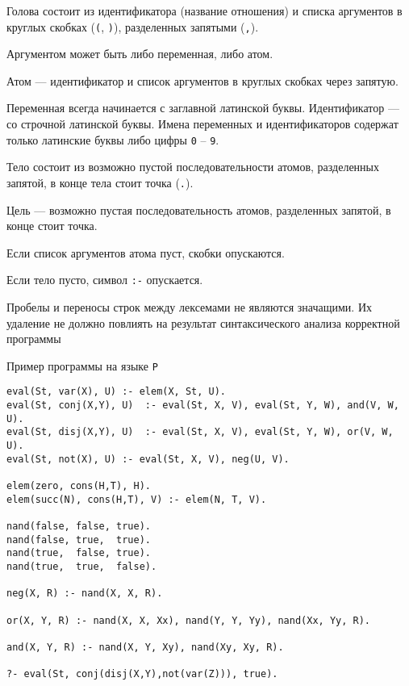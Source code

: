 \documentclass[12pt]{article}
\begin{document}
Голова состоит из идентификатора (название отношения) и списка аргументов в круглых скобках (\verb!(!, \verb!)!), разделенных запятыми (\verb!,!). 

Аргументом может быть либо переменная, либо атом. 

Атом --- идентификатор и список аргументов в круглых скобках через запятую. 

Переменная всегда начинается с заглавной латинской буквы. Идентификатор --- со строчной латинской буквы.
Имена переменных и идентификаторов содержат только латинские буквы либо цифры \verb!0! -- \verb!9!.

Тело состоит из возможно пустой последовательности атомов, разделенных запятой, в конце тела стоит точка (\verb!.!).

Цель --- возможно пустая последовательность атомов, разделенных запятой, в конце стоит точка. 

Если список аргументов атома пуст, скобки опускаются. 

Если тело пусто, символ \verb!:-! опускается. 

Пробелы и переносы строк между лексемами не являются значащими. Их удаление не должно повлиять на результат синтаксического анализа корректной программы
\newpage
\begin{center}
    \Large{Пример программы на языке \verb!P!}
\end{center}

\begin{verbatim}
eval(St, var(X), U) :- elem(X, St, U).
eval(St, conj(X,Y), U)  :- eval(St, X, V), eval(St, Y, W), and(V, W, U).
eval(St, disj(X,Y), U)  :- eval(St, X, V), eval(St, Y, W), or(V, W, U).
eval(St, not(X), U) :- eval(St, X, V), neg(U, V).

elem(zero, cons(H,T), H).
elem(succ(N), cons(H,T), V) :- elem(N, T, V).

nand(false, false, true).
nand(false, true,  true).
nand(true,  false, true).
nand(true,  true,  false).

neg(X, R) :- nand(X, X, R).

or(X, Y, R) :- nand(X, X, Xx), nand(Y, Y, Yy), nand(Xx, Yy, R).

and(X, Y, R) :- nand(X, Y, Xy), nand(Xy, Xy, R).

?- eval(St, conj(disj(X,Y),not(var(Z))), true).
\end{verbatim}
\end{document}
